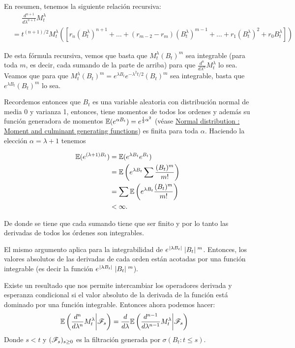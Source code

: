 En resumen, tenemos la siguiente relación recursiva:
\tiny
\begin{align}\label{problema6_4:equivalencia_recursiva}
    &\;\;\;\;\;\frac{d^{n+1}}{d\lambda^{n+1}} M_t^\lambda     \\
    &= t^{(n+1)/2}  M_t^\lambda \left( \left[ r_n (B_t^\lambda)^{n+1}  + \dots + (r_{m-2} - r_{m})(B_t^\lambda)^{m-1} + \dots + r_1 (B_t^\lambda)^2 + r_0 B_t^\lambda \right]\right) 
\end{align}\pn
\normalsize

De esta fórmula recursiva, vemos que basta que $M_t^\lambda (B_t)^m$ sea integrable (para toda $m$, es decir, cada sumando de la parte de arriba) para que 
$\frac{d^{n}}{d\lambda^{n}} M_t^\lambda$ lo sea. Veamos que para que $M_t^\lambda (B_t)^m = e^{\lambda B_t}e^{-\lambda^2t/2} (B_t)^m$ sea integrable,
basta que $e^{\lambda B_t} (B_t)^m$ lo sea.\pn

Recordemos entonces que $B_t$ es una variable aleatoria con distribución normal de media 0 y varianza 1, entonces, tiene momentos
de todos los ordenes y además su función generadora de momentos $\mathbb{E}(e^{\alpha B_t}) = e^{\frac{1}{2} \alpha^2}$ 
(véase \href{https://en.wikipedia.org/wiki/Normal_distribution#Moment_and_cumulant_generating_functions}{Normal distribution : Moment and culminant generating functions})
es finita para toda $\alpha$. Haciendo la elección $\alpha = \lambda + 1$ tenemos\pn

\begin{align}
        \mathbb{E}(e^{(\lambda + 1) B_t})   &=  \mathbb{E}(e^{\lambda B_t} e^{B_t}) \\
                                    &=  \mathbb{E}\left(e^{\lambda B_t} \sum \frac{(B_t)^m}{m!}\right) \\
                                    &=  \sum \mathbb{E}\left(e^{\lambda B_t} \frac{(B_t)^m}{m!}\right) \\
                                    &<  \infty.
\end{align}\pn

De donde se tiene que cada sumando tiene que ser finito y por lo tanto las derivadas de todos los órdenes son integrables.\pn

El mismo argumento aplica para la integrabilidad de $e^{\hspace{.25mm}\left|\lambda B_t\right|\hspace{.25mm}} \hspace{.25mm}\left|B_t\right|\hspace{.25mm}^m$.
Entonces, los valores absolutos de las derivadas de cada orden están acotadas por una función integrable 
(es decir la función $e^{\hspace{.25mm}\left|\lambda B_t\right|\hspace{.25mm}} \hspace{.25mm}\left|B_t\right|\hspace{.25mm}^m$).\pn

Existe un resultado que nos permite intercambiar los operadores derivada y esperanza condicional si el valor absoluto de la derivada de la
función está dominado por una función integrable. Entonces ahora podemos hacer:
\begin{align}
        \mathbb{E}\left(\frac{d^n}{d \lambda^n} M_t^\lambda \bigg| \mathscr{F}_{s}\right)   &=   \frac{d}{d \lambda} \mathbb{E}\left(\frac{d^{n-1}}{d \lambda^{n-1}} M_t^\lambda \bigg| \mathscr{F}_{s}\right)
\end{align}\pn
Donde $s<t$ y $(\mathscr{F}_s)_{s \geq 0}$ es la filtración generada por $\sigma(B_t : t\leq s)$.\pn

